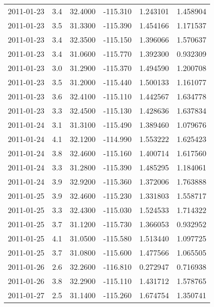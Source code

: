 \begin{tabular}{lrrrrr}
2011-01-23 &       3.4 &  32.4000 &  -115.310 &         1.243101 &         1.458904 \\
2011-01-23 &       3.5 &  31.3300 &  -115.390 &         1.454166 &         1.171537 \\
2011-01-23 &       3.4 &  32.3500 &  -115.150 &         1.396066 &         1.570637 \\
2011-01-23 &       3.4 &  31.0600 &  -115.770 &         1.392300 &         0.932309 \\
2011-01-23 &       3.0 &  31.2900 &  -115.370 &         1.494590 &         1.200708 \\
2011-01-23 &       3.5 &  31.2000 &  -115.440 &         1.500133 &         1.161077 \\
2011-01-23 &       3.6 &  32.4100 &  -115.110 &         1.442567 &         1.634778 \\
2011-01-23 &       3.3 &  32.4500 &  -115.130 &         1.428636 &         1.637834 \\
2011-01-24 &       3.1 &  31.3100 &  -115.490 &         1.389460 &         1.079676 \\
2011-01-24 &       4.1 &  32.1200 &  -114.990 &         1.553222 &         1.625423 \\
2011-01-24 &       3.8 &  32.4600 &  -115.160 &         1.400714 &         1.617560 \\
2011-01-24 &       3.3 &  31.2800 &  -115.390 &         1.485295 &         1.184061 \\
2011-01-24 &       3.9 &  32.9200 &  -115.360 &         1.372006 &         1.763888 \\
2011-01-25 &       3.9 &  32.4600 &  -115.230 &         1.331803 &         1.558717 \\
2011-01-25 &       3.3 &  32.4300 &  -115.030 &         1.524533 &         1.714322 \\
2011-01-25 &       3.7 &  31.1200 &  -115.730 &         1.366053 &         0.932952 \\
2011-01-25 &       4.1 &  31.0500 &  -115.580 &         1.513440 &         1.097725 \\
2011-01-25 &       3.7 &  31.0800 &  -115.600 &         1.477566 &         1.065505 \\
2011-01-26 &       2.6 &  32.2600 &  -116.810 &         0.272947 &         0.716938 \\
2011-01-26 &       3.8 &  32.2900 &  -115.110 &         1.431712 &         1.578765 \\
2011-01-27 &       2.5 &  31.1400 &  -115.260 &         1.674754 &         1.350741 \\

\end{tabular}
